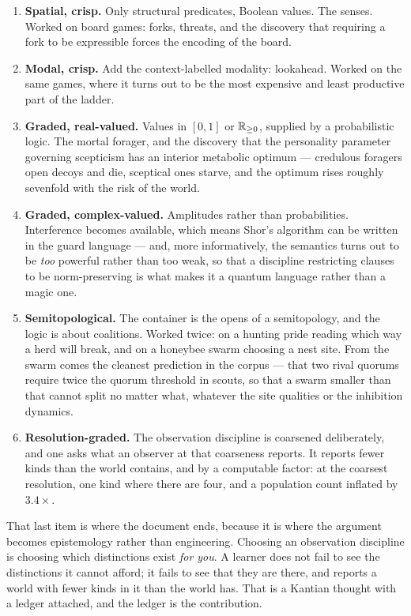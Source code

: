\begin{enumerate}[leftmargin=2em]
\item \textbf{Spatial, crisp.} Only structural predicates, Boolean values. The
senses. Worked on board games: forks, threats, and the discovery that requiring a
fork to be expressible forces the encoding of the board.

\item \textbf{Modal, crisp.} Add the context-labelled modality: lookahead. Worked
on the same games, where it turns out to be the most expensive and least
productive part of the ladder.

\item \textbf{Graded, real-valued.} Values in $[0,1]$ or $\mathbb{R}_{\ge 0}$, supplied by
a probabilistic logic. The mortal forager, and the discovery that the personality
parameter governing scepticism has an interior metabolic optimum --- credulous
foragers open decoys and die, sceptical ones starve, and the optimum rises
roughly sevenfold with the risk of the world.

\item \textbf{Graded, complex-valued.} Amplitudes rather than probabilities.
Interference becomes available, which means Shor's algorithm can be written in the
guard language --- and, more informatively, the semantics turns out to be
\emph{too} powerful rather than too weak, so that a discipline restricting clauses
to be norm-preserving is what makes it a quantum language rather than a magic one.

\item \textbf{Semitopological.} The container is the opens of a semitopology, and
the logic is about coalitions. Worked twice: on a hunting pride reading which way
a herd will break, and on a honeybee swarm choosing a nest site. From the swarm
comes the cleanest prediction in the corpus --- that two rival quorums require
twice the quorum threshold in scouts, so that a swarm smaller than that cannot
split no matter what, whatever the site qualities or the inhibition dynamics.

\item \textbf{Resolution-graded.} The observation discipline is coarsened
deliberately, and one asks what an observer at that coarseness reports. It
reports fewer kinds than the world contains, and by a computable factor: at the
coarsest resolution, one kind where there are four, and a population count
inflated by $3.4\times$.
\end{enumerate}

That last item is where the document ends, because it is where the argument
becomes epistemology rather than engineering. Choosing an observation discipline
is choosing which distinctions exist \emph{for you}. A learner does not fail to
see the distinctions it cannot afford; it fails to see that they are there, and
reports a world with fewer kinds in it than the world has. That is a Kantian
thought with a ledger attached, and the ledger is the contribution.

